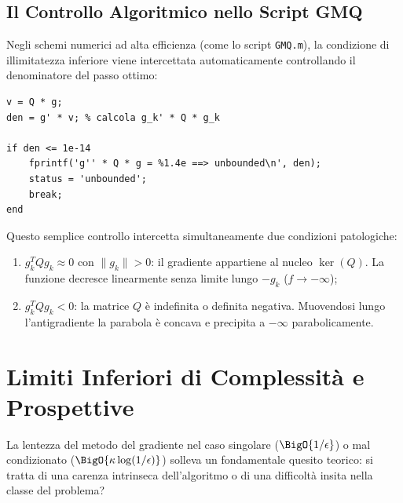 \subsection{Il Controllo Algoritmico nello Script GMQ}
Negli schemi numerici ad alta efficienza (come lo script \texttt{GMQ.m}), la condizione di illimitatezza inferiore viene intercettata automaticamente controllando il denominatore del passo ottimo:
\begin{lstlisting}[style=code,caption={Verifica numerica di illimitatezza nello script GMQ.}]
v = Q * g;
den = g' * v; % calcola g_k' * Q * g_k

if den <= 1e-14
    fprintf('g'' * Q * g = %1.4e ==> unbounded\n', den);
    status = 'unbounded';
    break;
end
\end{lstlisting}
Questo semplice controllo intercetta simultaneamente due condizioni patologiche:
\begin{enumerate}
    \item $g_k^T Q g_k \approx 0$ con $\|g_k\| > 0$: il gradiente appartiene al nucleo $\ker(Q)$. La funzione decresce linearmente senza limite lungo $-g_k$ ($f \to -\infty$);
    \item $g_k^T Q g_k < 0$: la matrice $Q$ \`e indefinita o definita negativa. Muovendosi lungo l'antigradiente la parabola \`e concava e precipita a $-\infty$ parabolicamente.
\end{enumerate}

\FloatBarrier
\section{Limiti Inferiori di Complessit\`a e Prospettive}
\label{sec:limiti-inferiori-complessita}

La lentezza del metodo del gradiente nel caso singolare ($\BigO{1/\epsilon}$) o mal condizionato ($\BigO{\kappa \log(1/\epsilon)}$) solleva un fondamentale quesito teorico: si tratta di una carenza intrinseca dell'algoritmo o di una difficolt\`a insita nella classe del problema?

